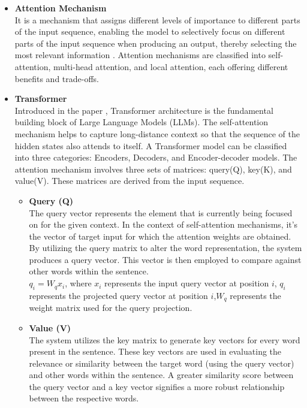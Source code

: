 \documentclass[preprint,12pt]{elsarticle}
\begin{document}
\begin{itemize}
	\item \textbf{Attention Mechanism}\\
	It is a mechanism that assigns different levels of importance to different parts of the input sequence, enabling the model to selectively focus on different parts of the input sequence when producing an output, thereby selecting the most relevant information \cite{bahdanau2014neural}. Attention mechanisms are classified into self-attention, multi-head attention, and local attention, each offering different benefits and trade-offs.
	
	\item \textbf{Transformer}\\
	Introduced in the paper \cite{vaswani2017attention}, Transformer architecture is the fundamental building block of Large Language Models (LLMs). The self-attention mechanism helps to capture long-distance context so that the sequence of the hidden states also attends to itself. A Transformer model can be classified into three categories: Encoders, Decoders, and Encoder-decoder models\cite{sutskever2014sequence}. The attention mechanism involves three sets of matrices: query(Q), key(K), and value(V). These matrices are derived from the input sequence.
	\begin{itemize}
		\item \textbf{Query (Q)}\\
		The query vector represents the element that is currently being focused on for the given context. In the context of self-attention mechanisms, it’s the vector of target input for which the attention weights are obtained. By utilizing the query matrix to alter the word representation, the system produces a query vector. This vector is then employed to compare against other words within the sentence.\\
		$q_{i}=W_{q}x_{i}$,  where $x_{i}$ represents the input query vector at position $i$, $q_{i}$ represents the projected query vector at position $i$,$W_{q}$ represents the weight matrix used for the query projection.
		\item \textbf{Value (V)}\\
		The system utilizes the key matrix to generate key vectors for every word present in the sentence. These key vectors are used in evaluating the relevance or similarity between the target word (using the query vector) and other words within the sentence. A greater similarity score between the query vector and a key vector signifies a more robust relationship between the respective words.\\

\end{itemize}
\end{itemize}
\end{document}
